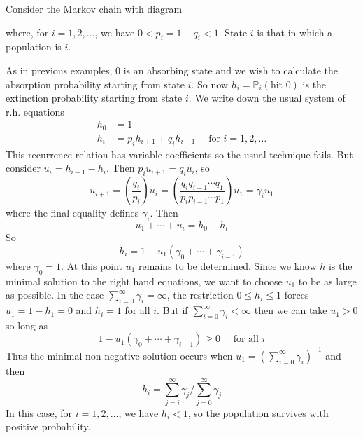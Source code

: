 \documentclass[a4paper,11pt]{article}
\begin{document}
\begin{example}
	Consider the Markov chain with diagram
    \begin{center}
        \end{center}
        where, for $i=1,2, \ldots$, we have $0<p_{i}=1-q_{i}<1$. State $i$ is that in which a population is $i$.

    As in previous examples, 0 is an absorbing state and we wish to calculate the absorption probability starting from state $i$. So now $h_{i}=\mathbb{P}_i(\text{hit 0})$ is the extinction probability starting from state $i$. We write down the usual system of r.h. equations
    \[
    \begin{aligned}
    h_{0} &=1 \\
    h_{i} &=p_{i} h_{i+1}+q_{i} h_{i-1} \quad \text { for } i=1,2, \ldots
    \end{aligned}
    \]
    This recurrence relation has variable coefficients so the usual technique fails. But consider $u_{i}=h_{i-1}-h_{i} .$ Then $p_{i} u_{i+1}=q_{i} u_{i}$, so
    \[
    u_{i+1}=\left(\frac{q_{i}}{p_{i}}\right) u_{i}=\left(\frac{q_{i} q_{i-1} \cdots q_{1}}{p_{i} p_{i-1} \cdots p_{1}}\right) u_{1}=\gamma_{i} u_{1}
    \]
    where the final equality defines $\gamma_{i} $. Then
    \[
    u_{1}+\cdots+u_{i}=h_{0}-h_{i}
    \]
    So
    \[
    h_{i}=1-u_{1}\left(\gamma_{0}+\cdots+\gamma_{i-1}\right)
    \]
    where $\gamma_{0}=1$. At this point $u_{1}$ remains to be determined. Since we know $h$ is the minimal solution to the right hand equations, we want to choose $u_{1}$ to be as large as possible. In the case $\sum_{i=0}^{\infty} \gamma_{i}=\infty$, the restriction $0 \leq h_{i} \leq 1$ forces $u_{1}=1-h_{1}=0$ and $h_{i}=1$ for all $i .$ But if $\sum_{i=0}^{\infty} \gamma_{i}<\infty$ then we can take $u_{1}>0$ so long as
    \[
    1-u_{1}\left(\gamma_{0}+\cdots+\gamma_{i-1}\right) \geq 0 \quad \text { for all } i
    \]
    Thus the minimal non-negative solution occurs when $u_{1}=\left(\sum_{i=0}^{\infty} \gamma_{i}\right)^{-1}$ and then
    \[
    h_{i}=\sum_{j=i}^{\infty} \gamma_{j}\bigg/\sum_{j=0}^{\infty} \gamma_{j}
    \]
    In this case, for $i=1,2, \ldots$, we have $h_{i}<1$, so the population survives with positive probability. 
\end{example}
\end{document}
